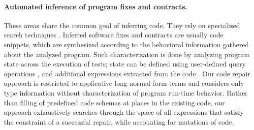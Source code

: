 \vspace{-0.5em}
\paragraph{{\bf Automated inference of program fixes and contracts.}}
These areas share the common goal of inferring code. They rely on specialized
search techniques
\cite{WeiETAL11InferringBetterContracts,PeiETAL11CodebasedAutomatedProgramFixing}.
Inferred software fixes and contracts are usually code snippets, which are
synthesized according to the behavioral information gathered about the analyzed program.
Such characterization is done by analyzing program state across the execution of
tests;
state can be defined using user-defined query operations
\cite{WeiETAL10AutomatedFixingProgramsContracts,WeiETAL11InferringBetterContracts}, and additional expressions extracted from
the code \cite{PeiETAL11CodebasedAutomatedProgramFixing}.
Our code repair approach is restricted to applicative long normal form terms and
considers only type information without characterization of program run-time
behavior.
Rather than filling of predefined code schemas at places in the existing code,
our approach exhaustively searches through the space of all expressions that
satisfy the constraint of a successful repair, while accounting for mutations of
 code.

\vspace{-0.5em}
